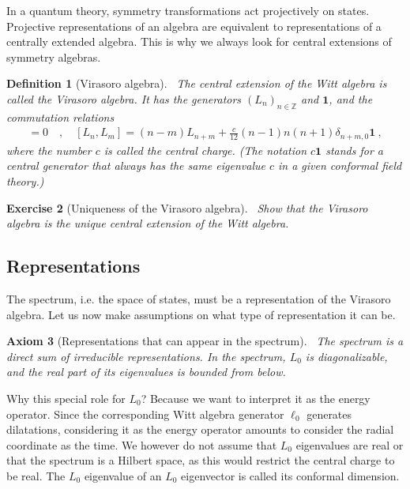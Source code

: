 \documentclass[12pt, a4paper]{article}
\theoremstyle{break}
\newtheorem{exo}{Exercise}[section]
\newtheorem{hyp}[exo]{Axiom}
\newtheorem{defn}[exo]{Definition}
\begin{document}
In a quantum theory, symmetry transformations act projectively on states. 
Projective representations of an algebra are equivalent to representations of a centrally extended algebra. 
This is why we always look for central extensions of symmetry algebras.

\begin{defn}[Virasoro algebra]
 ~\label{def:vir}
 The central extension of the Witt algebra is called the Virasoro algebra. It has the generators $(L_n)_{n\in\mathbb{Z}}$ and $\mathbf 1$, and the commutation relations
 \begin{align}
  [\mathbf 1, L_n] = 0 \quad , \quad [L_n,L_m] = (n-m)L_{n+m} +\frac{c}{12}(n-1)n(n+1)\delta_{n+m,0}\mathbf 1 \ ,
  \label{eq:vir}
 \end{align}
 where the number $c$ is called the central charge. (The notation $c\mathbf 1$ stands for a central generator that always has the same eigenvalue $c$ in a given conformal field theory.)
\end{defn}

\begin{exo}[Uniqueness of the Virasoro algebra]
 ~\label{exo:vir}
 Show that the Virasoro algebra is the unique central extension of the Witt algebra.
\end{exo}


\subsection{Representations}

The spectrum, i.e. the space of states, must be a representation of the Virasoro algebra. Let us now make assumptions on what type of representation it can be.

\begin{hyp}[Representations that can appear in the spectrum]
 ~\label{hyp:rep}
 The spectrum is a direct sum of irreducible representations. In the spectrum, $L_0$ is diagonalizable, and the real part of its eigenvalues is bounded from below.
\end{hyp}

Why this special role for $L_0$? Because we want to interpret it as the energy operator. Since the corresponding Witt algebra generator $\ell_0$ generates dilatations, considering it as the energy operator amounts to consider the radial coordinate as the time. We however do not assume that $L_0$ eigenvalues are real or that the spectrum is a Hilbert space, as this would restrict the central charge to be real. The $L_0$ eigenvalue of an $L_0$ eigenvector is called its conformal dimension.
\end{document}
